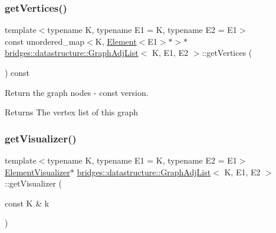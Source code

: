 \subsubsection{\texorpdfstring{get\+Vertices()}{getVertices()}\hspace{0.1cm}{\footnotesize\ttfamily [2/2]}}
{\footnotesize\ttfamily template$<$typename K, typename E1 = K, typename E2 = E1$>$ \\
const unordered\+\_\+map$<$K, \hyperlink{classbridges_1_1datastructure_1_1_element}{Element}$<$E1$>$$\ast$$>$$\ast$ \hyperlink{classbridges_1_1datastructure_1_1_graph_adj_list}{bridges\+::datastructure\+::\+Graph\+Adj\+List}$<$ K, E1, E2 $>$\+::get\+Vertices (\begin{DoxyParamCaption}{ }\end{DoxyParamCaption}) const\hspace{0.3cm}{\ttfamily [inline]}}



Return the graph nodes -\/ const version. 

\begin{DoxyReturn}{Returns}
The vertex list of this graph 
\end{DoxyReturn}
\mbox{\label{classbridges_1_1datastructure_1_1_graph_adj_list_a097e4678b1273c29b1ac63319b4535e5}} 
\subsubsection{\texorpdfstring{get\+Visualizer()}{getVisualizer()}}
{\footnotesize\ttfamily template$<$typename K, typename E1 = K, typename E2 = E1$>$ \\
\hyperlink{classbridges_1_1datastructure_1_1_element_visualizer}{Element\+Visualizer}$\ast$ \hyperlink{classbridges_1_1datastructure_1_1_graph_adj_list}{bridges\+::datastructure\+::\+Graph\+Adj\+List}$<$ K, E1, E2 $>$\+::get\+Visualizer (\begin{DoxyParamCaption}\item[{const K \&}]{k }\end{DoxyParamCaption})\hspace{0.3cm}{\ttfamily [inline]}}



